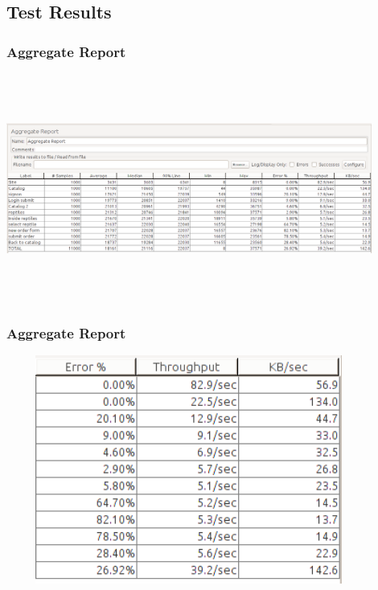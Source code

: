 \documentclass[12pt]{beamer}
\begin{document}
  \subsection{Test Results}
  \begin{frame}
    \frametitle{Aggregate Report}
    \includegraphics[width=12cm, height=7.5cm]{images/dbt3}
    
  \end{frame}
  
    \begin{frame}
    \frametitle{Aggregate Report}
    \includegraphics[width=12cm, height=7.5cm]{images/dbt4}
    
  \end{frame}
\end{document}
